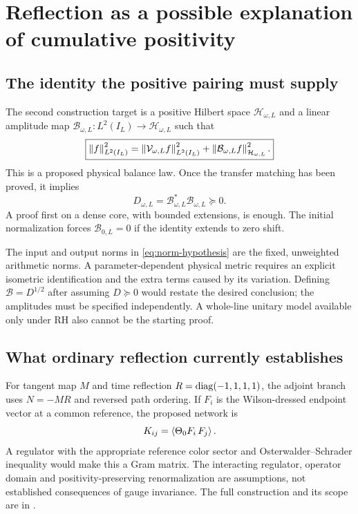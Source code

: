 \section{Reflection as a possible explanation of cumulative positivity}
\label{sec:storage}

\subsection{The identity the positive pairing must supply}

The second construction target is a positive Hilbert space
$\mathcal H_{\omega,L}$ and a linear amplitude map
$\mathcal B_{\omega,L}:L^2(I_L)\to\mathcal H_{\omega,L}$ such that
\begin{equation}\label{eq:norm-hypothesis}
 \boxed{\left\lVert f\right\rVert_{L^2(I_L)}^2
 =\left\lVert\mathcal V_{\omega,L}f\right\rVert_{L^2(I_L)}^2
 +\left\lVert\mathcal B_{\omega,L}f\right\rVert_{\mathcal H_{\omega,L}}^2.}
\end{equation}
This is a proposed physical balance law. Once the transfer
matching has been proved, it implies
\begin{equation}
 D_{\omega,L}=\mathcal B_{\omega,L}^*\mathcal B_{\omega,L}
 \succeq0.
\end{equation}
A proof first on a dense core, with bounded extensions, is enough.
The initial normalization forces $\mathcal B_{0,L}=0$ if the
identity extends to zero shift.

The input and output norms in \eqref{eq:norm-hypothesis} are the
fixed, unweighted arithmetic norms. A parameter-dependent physical
metric requires an explicit isometric identification and the extra
terms caused by its variation. Defining $\mathcal B=D^{1/2}$ after
assuming $D\succeq0$ would restate the desired conclusion; the
amplitudes must be specified independently. A whole-line unitary
model available only under RH also cannot be the starting proof.

\subsection{What ordinary reflection currently establishes}

For tangent map $M$ and time reflection
$R=\operatorname{diag}(-1,1,1,1)$, the adjoint branch uses $N=-MR$ and reversed
path ordering. If $F_i$ is the Wilson-dressed endpoint vector at a
common reference, the proposed network is
\[
 K_{ij}=\left\langle\Theta_0F_i\,F_j\right\rangle.
\]
A regulator with the appropriate reference color sector and
Osterwalder--Schrader inequality would make this a Gram matrix.
The interacting regulator, operator domain and positivity-preserving
renormalization are assumptions, not established consequences of
gauge invariance. The full construction and its scope are in
\cite[Section~S7]{Supplement}.

